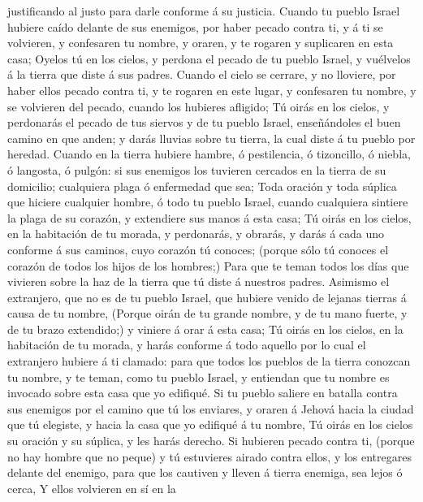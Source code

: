 justificando al justo para darle conforme á su justicia. 
Cuando tu pueblo Israel hubiere caído delante de sus enemigos, por haber
pecado contra ti, y á ti se volvieren, y confesaren tu nombre, y oraren,
y te rogaren y suplicaren en esta casa;  Oyelos tú en los
cielos, y perdona el pecado de tu pueblo Israel, y vuélvelos á la tierra
que diste á sus padres.  Cuando el cielo se cerrare, y no
lloviere, por haber ellos pecado contra ti, y te rogaren en este lugar,
y confesaren tu nombre, y se volvieren del pecado, cuando los hubieres
afligido;  Tú oirás en los cielos, y perdonarás el pecado
de tus siervos y de tu pueblo Israel, enseñándoles el buen camino en que
anden; y darás lluvias sobre tu tierra, la cual diste á tu pueblo por
heredad.  Cuando en la tierra hubiere hambre, ó
pestilencia, ó tizoncillo, ó niebla, ó langosta, ó pulgón: si sus
enemigos los tuvieren cercados en la tierra de su domicilio; cualquiera
plaga ó enfermedad que sea;  Toda oración y toda súplica
que hiciere cualquier hombre, ó todo tu pueblo Israel, cuando cualquiera
sintiere la plaga de su corazón, y extendiere sus manos á esta casa;
 Tú oirás en los cielos, en la habitación de tu morada, y
perdonarás, y obrarás, y darás á cada uno conforme á sus caminos, cuyo
corazón tú conoces; (porque sólo tú conoces el corazón de todos los
hijos de los hombres;)  Para que te teman todos los días
que vivieren sobre la haz de la tierra que tú diste á nuestros padres.
 Asimismo el extranjero, que no es de tu pueblo Israel, que
hubiere venido de lejanas tierras á causa de tu nombre, 
(Porque oirán de tu grande nombre, y de tu mano fuerte, y de tu brazo
extendido;) y viniere á orar á esta casa;  Tú oirás en los
cielos, en la habitación de tu morada, y harás conforme á todo aquello
por lo cual el extranjero hubiere á ti clamado: para que todos los
pueblos de la tierra conozcan tu nombre, y te teman, como tu pueblo
Israel, y entiendan que tu nombre es invocado sobre esta casa que yo
edifiqué.  Si tu pueblo saliere en batalla contra sus
enemigos por el camino que tú los enviares, y oraren á Jehová hacia la
ciudad que tú elegiste, y hacia la casa que yo edifiqué á tu nombre,
 Tú oirás en los cielos su oración y su súplica, y les
harás derecho.  Si hubieren pecado contra ti, (porque no
hay hombre que no peque) y tú estuvieres airado contra ellos, y los
entregares delante del enemigo, para que los cautiven y lleven á tierra
enemiga, sea lejos ó cerca,  Y ellos volvieren en sí en la
